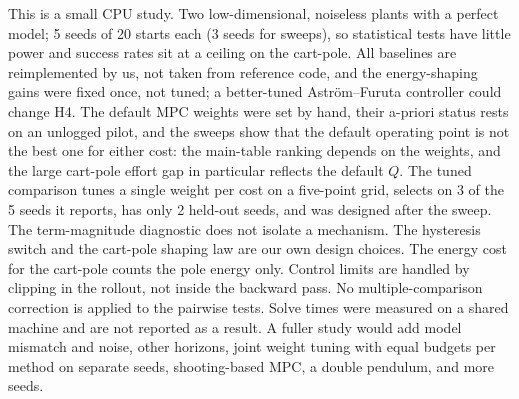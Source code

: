 This is a small CPU study. Two low-dimensional, noiseless plants with a perfect model; 5 seeds of 20 starts each (3 seeds for sweeps), so statistical tests have little power and success rates sit at a ceiling on the cart-pole. All baselines are reimplemented by us, not taken from reference code, and the energy-shaping gains were fixed once, not tuned; a better-tuned Astr\"om--Furuta controller could change H4. The default MPC weights were set by hand, their a-priori status rests on an unlogged pilot, and the sweeps show that the default operating point is not the best one for either cost: the main-table ranking depends on the weights, and the large cart-pole effort gap in particular reflects the default $Q$. The tuned comparison tunes a single weight per cost on a five-point grid, selects on 3 of the 5 seeds it reports, has only 2 held-out seeds, and was designed after the sweep. The term-magnitude diagnostic does not isolate a mechanism. The hysteresis switch and the cart-pole shaping law are our own design choices. The energy cost for the cart-pole counts the pole energy only. Control limits are handled by clipping in the rollout, not inside the backward pass. No multiple-comparison correction is applied to the pairwise tests. Solve times were measured on a shared machine and are not reported as a result. A fuller study would add model mismatch and noise, other horizons, joint weight tuning with equal budgets per method on separate seeds, shooting-based MPC, a double pendulum, and more seeds.
